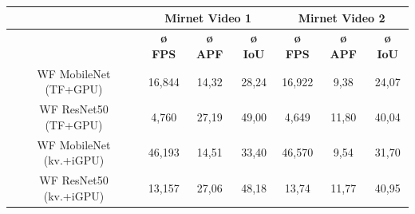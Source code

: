 \begin{table}[H]
  \centering
  \begin{tabular}{c|ccc|ccc|}
  \cline{2-7}
                                                                             & \multicolumn{3}{c|}{\cellcolor[HTML]{CBCEFB}\textbf{Mirnet Video 1}}                                                                       & \multicolumn{3}{c|}{\cellcolor[HTML]{CBCEFB}\textbf{Mirnet Video 2}}                                                                       \\ \hline
  \rowcolor[HTML]{E0DBDB} 
  \multicolumn{1}{|c|}{\cellcolor[HTML]{E0DBDB}\textbf{Model}}               & \multicolumn{1}{c|}{\cellcolor[HTML]{E0DBDB}\textbf{ø FPS}} & \multicolumn{1}{c|}{\cellcolor[HTML]{E0DBDB}\textbf{ø APF}} & \textbf{ø IoU} & \multicolumn{1}{c|}{\cellcolor[HTML]{E0DBDB}\textbf{ø FPS}} & \multicolumn{1}{c|}{\cellcolor[HTML]{E0DBDB}\textbf{ø APF}} & \textbf{ø IoU} \\ \hline
  \multicolumn{1}{|c|}{\cellcolor[HTML]{E0DBDB}WF MobileNet (TF+GPU)}      & \multicolumn{1}{c|}{16,844}                                 & \multicolumn{1}{c|}{14,32}                                  & 28,24          & \multicolumn{1}{c|}{16,922}                                 & \multicolumn{1}{c|}{9,38}                                   & 24,07          \\ \hline
  \multicolumn{1}{|c|}{\cellcolor[HTML]{E0DBDB}WF ResNet50 (TF+GPU)}       & \multicolumn{1}{c|}{4,760}                                  & \multicolumn{1}{c|}{27,19}                                  & 49,00          & \multicolumn{1}{c|}{4,649}                                  & \multicolumn{1}{c|}{11,80}                                  & 40,04          \\ \hline
  \multicolumn{1}{|c|}{\cellcolor[HTML]{E0DBDB}WF MobileNet (kv.+iGPU)} & \multicolumn{1}{c|}{46,193}                                 & \multicolumn{1}{c|}{14,51}                                  & 33,40          & \multicolumn{1}{c|}{46,570}                                 & \multicolumn{1}{c|}{9,54}                                   & 31,70          \\ \hline
  \multicolumn{1}{|c|}{\cellcolor[HTML]{E0DBDB}WF ResNet50 (kv.+iGPU)}  & \multicolumn{1}{c|}{13,157}                                 & \multicolumn{1}{c|}{27,06}                                  & 48,18          & \multicolumn{1}{c|}{13,74}                                  & \multicolumn{1}{c|}{11,77}                                  & 40,95          \\ \hline

\end{tabular}
\end{table}
